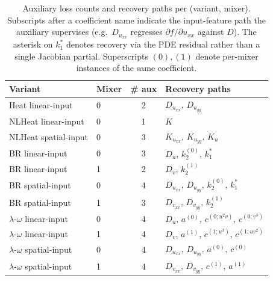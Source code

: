 \documentclass[10pt,journal,compsoc]{IEEEtran}
\begin{document}
\begin{table}[!t]
\centering
\caption{Auxiliary loss counts and recovery paths per (variant, mixer).
Subscripts after a coefficient name indicate the input-feature path the
auxiliary supervises (e.g.~$D_{u_{xx}}$ regresses
$\partial f / \partial u_{xx}$ against $D$). The asterisk on $k_1^{*}$
denotes recovery via the PDE residual rather than a single Jacobian
partial. Superscripts $(0), (1)$ denote per-mixer instances of the same
coefficient.}
\label{tab:aux_losses}
\small
\begin{tabular}{@{}llcl@{}}
\toprule
Variant & Mixer & \# aux & Recovery paths \\
\midrule
Heat linear-input & 0 & 2 & $D_{u_{xx}},\, D_{u_{yy}}$ \\
NLHeat linear-input & 0 & 1 & $K$ \\
NLHeat spatial-input & 0 & 3 & $K_{u_{xx}},\, K_{u_{yy}},\, K_{u}$ \\
BR linear-input & 0 & 3 & $D_u,\, k_2^{(0)},\, k_1^{*}$ \\
BR linear-input & 1 & 2 & $D_v,\, k_2^{(1)}$ \\
BR spatial-input & 0 & 4 & $D_{u_{xx}},\, D_{u_{yy}},\, k_2^{(0)},\, k_1^{*}$ \\
BR spatial-input & 1 & 3 & $D_{v_{xx}},\, D_{v_{yy}},\, k_2^{(1)}$ \\
$\lambda$-$\omega$ linear-input & 0 & 4 & $D_u,\, a^{(0)},\, c^{(0;u^2 v)},\, c^{(0;v^3)}$ \\
$\lambda$-$\omega$ linear-input & 1 & 4 & $D_v,\, a^{(1)},\, c^{(1;u^3)},\, c^{(1;u v^2)}$ \\
$\lambda$-$\omega$ spatial-input & 0 & 4 & $D_{u_{xx}},\, D_{u_{yy}},\, a^{(0)},\, c^{(0)}$ \\
$\lambda$-$\omega$ spatial-input & 1 & 4 & $D_{v_{xx}},\, D_{v_{yy}},\, c^{(1)},\, a^{(1)}$ \\
\bottomrule
\end{tabular}
\end{table}
\end{document}
